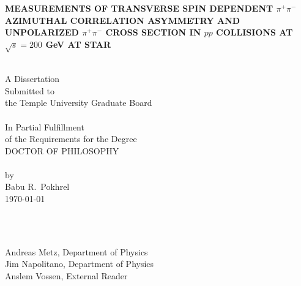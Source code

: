 \begin{titlepage}

\begin{centering} 
{\bf {\Large  MEASUREMENTS OF TRANSVERSE SPIN DEPENDENT $\pi^+\pi^-$ AZIMUTHAL CORRELATION ASYMMETRY AND UNPOLARIZED $\pi^+\pi^-$ CROSS SECTION IN $pp$ COLLISIONS AT $\sqrt s  = 200$ GeV AT STAR}}

\vspace{1cm}
\noindent\makebox[\linewidth]{\rule{16cm}{0.4pt}} \\ 
\vspace{1cm}
A Dissertation                       \\
Submitted to                         \\
the Temple University Graduate Board \\
\vspace{1cm}
\noindent\makebox[\linewidth]{\rule{16cm}{0.4pt}} \\ 
\vspace{1cm} 
In Partial Fulfillment               \\
of the Requirements for the Degree   \\
DOCTOR OF PHILOSOPHY                 \\
\vspace{1cm} 
\noindent\makebox[\linewidth]{\rule{16cm}{0.4pt}} \\ 
\vspace{1cm} 
by                                   \\
Babu R.\ Pokhrel                       \\
\today \\
\end{centering}                      

\vspace{1cm}
\\
\vspace{0.20cm}

        \\
{Andreas Metz, Department of Physics}                                        \\
{Jim Napolitano, Department of Physics}                                       \\
{Anslem Vossen, External Reader}

\end{titlepage}
